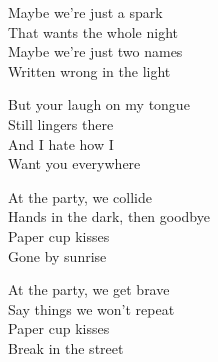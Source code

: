 \begin{lyrics}
Maybe we’re just a spark\\
That wants the whole night\\
Maybe we’re just two names\\
Written wrong in the light

But your laugh on my tongue\\
Still lingers there\\
And I hate how I\\
Want you everywhere

At the party, we collide\\
Hands in the dark, then goodbye\\
Paper cup kisses\\
Gone by sunrise

At the party, we get brave\\
Say things we won’t repeat\\
Paper cup kisses\\
Break in the street
\end{lyrics}

